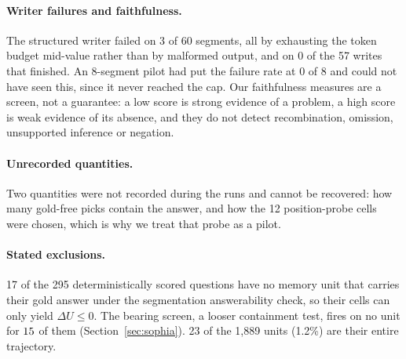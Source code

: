 \paragraph{Writer failures and faithfulness.}
The structured writer failed on 3 of 60 segments, all by exhausting the token
budget mid-value rather than by malformed output, and on 0 of the 57 writes
that finished. An 8-segment pilot had put the failure rate at 0 of 8 and could
not have seen this, since it never reached the cap. Our faithfulness measures
are a screen, not a guarantee: a low score is strong evidence of a problem,
a high score is weak evidence of its absence, and they do not detect
recombination, omission, unsupported inference or negation.

\paragraph{Unrecorded quantities.}
Two quantities were not recorded during the runs and cannot be recovered: how
many gold-free picks contain the answer, and how the 12 position-probe cells
were chosen, which is why we treat that probe as a pilot.

\paragraph{Stated exclusions.}
17 of the 295 deterministically scored questions have no memory unit that
carries their gold answer under the segmentation answerability check, so their
cells can only yield $\Delta U \le 0$. The bearing screen, a looser containment
test, fires on no unit for $15$ of them (Section~\ref{sec:sophia}).
23 of the 1{,}889 units (1.2\%) are their entire trajectory.
